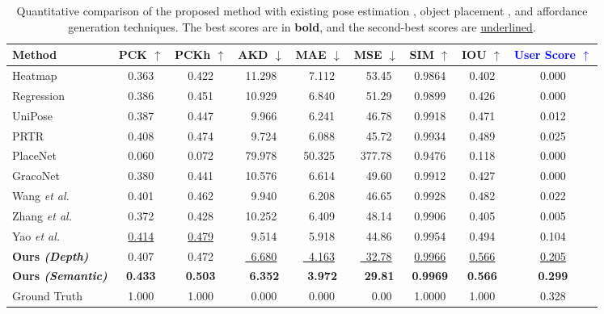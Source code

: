 \begin{table*}[t]
\centering
\caption{Quantitative comparison of the proposed method with existing pose estimation \cite{artacho2020unipose, li2021pose}, object placement \cite{zhang2020learning, zhou2022learning}, and affordance generation \cite{wang2017binge, yao2023scene, zhang2022inpaint} techniques. The best scores are in \textbf{bold}, and the second-best scores are \underline{underlined}.}
\label{tab:comparison}
\begin{tabular}{lcccccccc}
\hline
\rowcolor[HTML]{ECECEC}
  \textbf{Method} &
  \textbf{PCK $\uparrow$} &
  \textbf{PCKh $\uparrow$} &
  \textbf{AKD $\downarrow$} &
  \textbf{MAE $\downarrow$} &
  \textbf{MSE $\downarrow$} &
  \textbf{SIM $\uparrow$} &
  \textbf{IOU $\uparrow$} &
  \textbf{\textcolor{blue}{User Score $\uparrow$}} \\ \hline
Heatmap                                     & 0.363 & 0.422 & 11.298 & ~7.112 & ~53.45 & 0.9864 & 0.402 & 0.000 \\
Regression                                  & 0.386 & 0.451 & 10.929 & ~6.840 & ~51.29 & 0.9899 & 0.426 & 0.000 \\
UniPose \cite{artacho2020unipose}           & 0.387 & 0.447 & ~9.966 & ~6.241 & ~46.78 & 0.9918 & 0.471 & 0.012 \\
PRTR \cite{li2021pose}                      & 0.408 & 0.474 & ~9.724 & ~6.088 & ~45.72 & 0.9934 & 0.489 & 0.025 \\
PlaceNet \cite{zhang2020learning}           & 0.060 & 0.072 & 79.978 & 50.325 & 377.78 & 0.9476 & 0.118 & 0.000 \\
GracoNet \cite{zhou2022learning}            & 0.380 & 0.441 & 10.576 & ~6.614 & ~49.60 & 0.9912 & 0.427 & 0.000 \\ \hline
Wang \emph{et al.} \cite{wang2017binge}     & 0.401 & 0.462 & ~9.940 & ~6.208 & ~46.65 & 0.9928 & 0.482 & 0.022 \\
Zhang \emph{et al.} \cite{zhang2022inpaint} & 0.372 & 0.428 & 10.252 & ~6.409 & ~48.14 & 0.9906 & 0.405 & 0.005 \\
Yao \emph{et al.} \cite{yao2023scene}       &
\underline{0.414} &
\underline{0.479} &
~9.514 &
~5.918 &
~44.86 &
0.9954 &
0.494 &
0.104 \\ \hline
\rowcolor[HTML]{FFFFCC}
\textbf{Ours \emph{(Depth)}} &
0.407 &
0.472 &
\underline{~6.680} &
\underline{~4.163} &
\underline{~32.78} &
\underline{0.9966} &
\underline{0.566} &
\underline{0.205} \\
\rowcolor[HTML]{FFFFCC}
\textbf{Ours \emph{(Semantic)}} &
\textbf{0.433} &
\textbf{0.503} &
\textbf{~6.352} &
\textbf{~3.972} &
\textbf{~29.81} &
\textbf{0.9969} &
\textbf{0.566} &
\textbf{0.299} \\ \hline \hline
Ground Truth                                & 1.000 & 1.000 & ~0.000 & ~0.000 & ~~0.00 & 1.0000 & 1.000 & 0.328 \\ \hline
\end{tabular}%
\end{table*}


